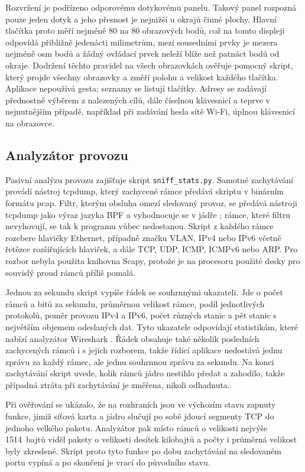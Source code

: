 Rozvržení je podřízeno odporovému dotykovému panelu. Takový panel rozpozná pouze jeden dotyk a jeho přesnost je nejnižší u okrajů činné plochy. Hlavní tlačítka proto měří nejméně 80 na 80 obrazových bodů, což na tomto displeji odpovídá přibližně jedenácti milimetrům, mezi sousedními prvky je mezera nejméně osm bodů a žádný ovládací prvek neleží blíže než patnáct bodů od okraje. Dodržení těchto pravidel na všech obrazovkách ověřuje pomocný skript, který projde všechny obrazovky a změří polohu a velikost každého tlačítka. Aplikace nepoužívá gesta; seznamy se listují tlačítky. Adresy se zadávají přednostně výběrem z nalezených cílů, dále číselnou klávesnicí a teprve v nejnutnějším případě, například při zadávání hesla sítě Wi-Fi, úplnou klávesnicí na obrazovce.

\subsection{Analyzátor provozu}
\label{sec:analyzator}

Pasivní analýzu provozu zajišťuje skript \texttt{sniff\_stats.py}. Samotné zachytávání provádí nástroj tcpdump, který zachycené rámce předává skriptu v binárním formátu pcap. Filtr, kterým obsluha omezí sledovaný provoz, se předává nástroji tcpdump jako výraz jazyka BPF a vyhodnocuje se v jádře \cite{mccanne1993}; rámce, které filtru nevyhovují, se tak k programu vůbec nedostanou. Skript z každého rámce rozebere hlavičky Ethernet, případně značku VLAN, IPv4 nebo IPv6 včetně řetězce rozšiřujících hlaviček, a dále TCP, UDP, ICMP, ICMPv6 nebo ARP. Pro rozbor nebyla použita knihovna Scapy, protože je na procesoru použité desky pro souvislý proud rámců příliš pomalá.

Jednou za sekundu skript vypíše řádek se souhrnnými ukazateli. Jde o počet rámců a bitů za sekundu, průměrnou velikost rámce, podíl jednotlivých protokolů, poměr provozu IPv4 a IPv6, počet různých stanic a pět stanic s největším objemem odeslaných dat. Tyto ukazatele odpovídají statistikám, které nabízí analyzátor Wireshark \cite{wiresharkstat}. Řádek obsahuje také několik posledních zachycených rámců i s jejich rozborem, takže řídicí aplikace nedostává jednu zprávu za každý rámec, ale jednu souhrnnou zprávu za sekundu. Na konci zachytávání skript uvede, kolik rámců jádro nestihlo předat a zahodilo, takže případná ztráta při zachytávání je změřena, nikoli odhadnuta.

Při ověřování se ukázalo, že na rozhraních jsou ve výchozím stavu zapnuty funkce, jimiž síťová karta a jádro slučují po sobě jdoucí segmenty TCP do jednoho velkého paketu. Analyzátor pak místo rámců o velikosti nejvýše 1514~bajtů viděl pakety o velikosti desítek kilobajtů a počty i průměrná velikost byly zkreslené. Skript proto tyto funkce po dobu zachytávání na sledovaném portu vypíná a po skončení je vrací do původního stavu.


